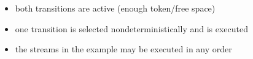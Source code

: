 \begin{frame}
\begin{itemize}
\item both transitions are active (enough token/free space)
\item one transition is selected nondeterministically and is executed
\item the streams in the example may be executed in any order
\end{itemize}
\end{frame}




